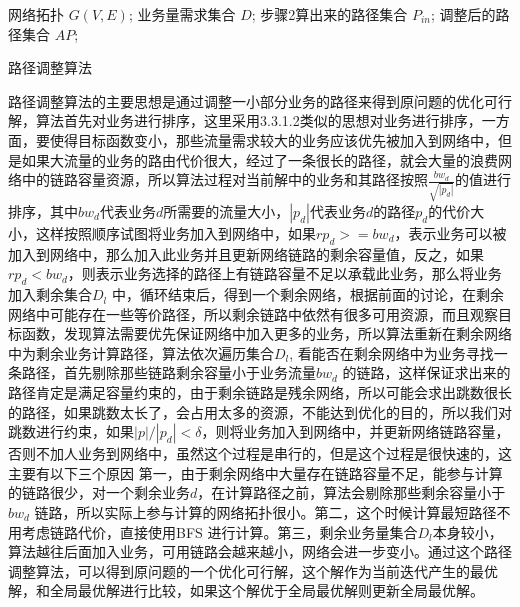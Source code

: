 \begin{algorithm}[t]
\begin{algorithmic}[1]
\Require
网络拓扑 $G(V, E)$;
业务量需求集合 $D$;
步骤2算出来的路径集合 $P_{in}$;
\Ensure
调整后的路径集合 $AP$;
\Else
{}
\EndIf
\EndFor
{}
\EndIf
\EndFor
{}
\EndIf
\EndFor
\end{algorithmic}
\caption{路径调整算法}
\label{PathAdj}
\end{algorithm}

路径调整算法的主要思想是通过调整一小部分业务的路径来得到原问题的优化可行解，算法首先对业务进行排序，这里采用3.3.1.2类似的思想对业务进行排序，一方面，要使得目标函数变小，那些流量需求较大的业务应该优先被加入到网络中，但是如果大流量的业务的路由代价很大，经过了一条很长的路径，就会大量的浪费网络中的链路容量资源，所以算法过程对当前解中的业务和其路径按照$\frac{bw_d}{\sqrt{|p_d|}}$的值进行排序，其中${bw_d}$代表业务$d$所需要的流量大小，$|p_d|$代表业务$d$的路径$p_d$的代价大小，这样按照顺序试图将业务加入到网络中，如果$rp_d>=bw_d$，表示业务可以被加入到网络中，那么加入此业务并且更新网络链路的剩余容量值，反之，如果$rp_d<bw_d$，则表示业务选择的路径上有链路容量不足以承载此业务，那么将业务加入剩余集合$D_l$ 中，循环结束后，得到一个剩余网络，根据前面的讨论，在剩余网络中可能存在一些等价路径，所以剩余链路中依然有很多可用资源，而且观察目标函数，发现算法需要优先保证网络中加入更多的业务，所以算法重新在剩余网络中为剩余业务计算路径，算法依次遍历集合$D_l$, 看能否在剩余网络中为业务寻找一条路径，首先剔除那些链路剩余容量小于业务流量$bw_d$ 的链路，这样保证求出来的路径肯定是满足容量约束的，由于剩余链路是残余网络，所以可能会求出跳数很长的路径，如果跳数太长了，会占用太多的资源，不能达到优化的目的，所以我们对跳数进行约束，如果$|p|/|p_d|<\delta$，则将业务加入到网络中，并更新网络链路容量，否则不加人业务到网络中，虽然这个过程是串行的，但是这个过程是很快速的，这主要有以下三个原因 第一，由于剩余网络中大量存在链路容量不足，能参与计算的链路很少，对一个剩余业务$d$，在计算路径之前，算法会剔除那些剩余容量小于$bw_d$ 链路，所以实际上参与计算的网络拓扑很小。第二，这个时候计算最短路径不用考虑链路代价，直接使用BFS 进行计算。第三，剩余业务量集合$D_l$本身较小，算法越往后面加入业务，可用链路会越来越小，网络会进一步变小。通过这个路径调整算法，可以得到原问题的一个优化可行解，这个解作为当前迭代产生的最优解，和全局最优解进行比较，如果这个解优于全局最优解则更新全局最优解。

